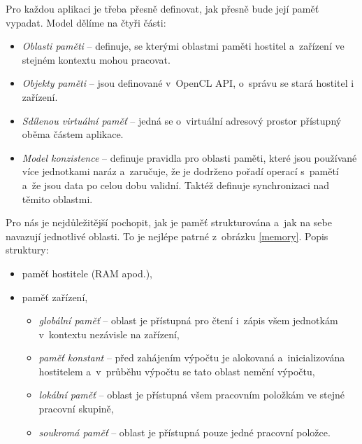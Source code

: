  Pro každou aplikaci je třeba přesně definovat, jak přesně bude její paměť vypadat.
Model dělíme na čtyři části:
\begin{itemize}
    \item {\it Oblasti paměti} -- definuje, se kterými oblastmi paměti hostitel a~zařízení ve
	stejném kontextu mohou pracovat.
    \item {\it Objekty paměti} -- jsou definované v~OpenCL API, o~správu se stará hostitel i
	zařízení.
    \item {\it Sdílenou virtuální paměť} -- jedná se o~virtuální adresový prostor přístupný oběma
	částem aplikace.
    \item {\it Model konzistence} -- definuje pravidla pro oblasti paměti, které jsou používané
	více jednotkami naráz a~zaručuje, že je dodrženo pořadí operací s~pamětí a~že jsou data po
	celou dobu validní. Taktéž definuje synchronizaci nad těmito oblastmi.
\end{itemize}
Pro nás je nejdůležitější pochopit, jak je paměť strukturována a~jak na sebe navazují
jednotlivé oblasti. To je nejlépe patrné z~obrázku \ref{memory}. Popis struktury:
\begin{itemize}
    \item paměť hostitele (RAM apod.),
    \item paměť zařízení,
    \begin{itemize}
	\item {\it globální paměť} -- oblast je přístupná pro čtení i~zápis všem jednotkám
v~kontextu nezávisle na zařízení,
	\item {\it paměť konstant} -- před zahájením výpočtu je alokovaná a~inicializována
	    hostitelem a~v~průběhu výpočtu se tato oblast nemění výpočtu,
	\item {\it lokální paměť} -- oblast je přístupná všem pracovním položkám ve
	    stejné pracovní skupině,
	\item {\it soukromá paměť} -- oblast je přístupná pouze jedné pracovní položce.
    \end{itemize}
\end{itemize}
